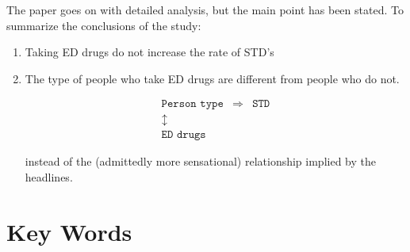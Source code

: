 \documentclass[11pt, chapterprefix=true]{scrbook}\usepackage[]{graphicx}\usepackage[]{color}
\begin{document}
The paper goes on with detailed analysis, but the main point has been stated.  To summarize the conclusions of the study:

\begin{enumerate}
	\item Taking ED drugs do not increase the rate of STD's
	\item The type of people who take ED drugs are different from people who do not.

	\begin{eqnarray*}
\texttt{Person type} & \Rightarrow & \texttt{STD} \\
\updownarrow &  & \\
\texttt{ED drugs} & &
\end{eqnarray*}

instead of the (admittedly more sensational) relationship implied by the headlines.

\end{enumerate}


\section{Key Words}


\twocolumn
\section{}
\end{document}
